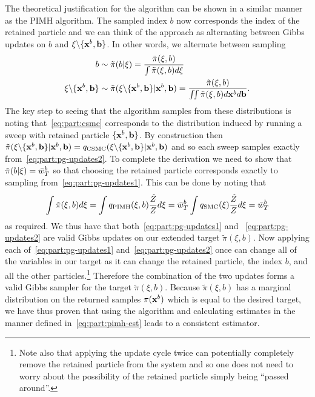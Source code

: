 The theoretical justification for the \pg algorithm can be shown in a similar manner as the PIMH algorithm.
The sampled index $b$ now corresponds the index of the retained particle and we can think of the
approach as alternating between Gibbs updates on $b$ and $\mathbf{\xi} \backslash \{\mathbf{x}^b,\mathbf{b}\}$.    In other
words, we alternate between sampling 
\begin{subequations}
	\label{eq:part:pg-updates}
	\begin{align}
	b &\sim \tilde{\pi}(b | \mathbf{\xi}) = \frac{\tilde{\pi}(\xi,b)}{\int \tilde{\pi}(\xi,b) d\xi} \label{eq:part:pg-updates1}\\
	\mathbf{\xi} \backslash \{\mathbf{x}^b,\mathbf{b}\} & \sim \tilde{\pi}(\mathbf{\xi} \backslash \{\mathbf{x}^b,\mathbf{b}\}  | \mathbf{x}^b,\mathbf{b}) =
	\frac{\tilde{\pi}(\xi,b)}{\iint \tilde{\pi}(\xi,b) d\mathbf{x}^b d\mathbf{b}}. \label{eq:part:pg-updates2}
		\end{align}
\end{subequations} 
The key step to seeing that the \pg
algorithm samples from these distributions is noting that~\eqref{eq:part:csmc} corresponds to the distribution
induced by running a \csmc sweep with retained particle $\{\mathbf{x}^b,\mathbf{b}\}$.  By construction
then $\tilde{\pi}(\mathbf{\xi} \backslash \{\mathbf{x}^b,\mathbf{b}\}  | \mathbf{x}^b,\mathbf{b}) = q_{\text{CSMC}}(\mathbf{\xi} \backslash \{\mathbf{x}^b,\mathbf{b}\}  | \mathbf{x}^b,\mathbf{b})$
and so each \csmc sweep samples exactly from~\eqref{eq:part:pg-updates2}.  To complete the derivation
we need to show that $\tilde{\pi}(b | \mathbf{\xi}) = \bar{w}_T^b$ so that choosing the retained particle corresponds
exactly to sampling from~\eqref{eq:part:pg-updates1}.    This can be done by noting that
\begin{align}
\int \tilde{\pi}(\xi,b) d\xi = \int q_{\text{PIMH}}(\mathbf{\xi},b) \frac{\hat{Z}}{Z} d\xi = \bar{w}_T^b
\int q_{\text{SMC}}(\mathbf{\xi}) \frac{\hat{Z}}{Z} d\xi = \bar{w}_T^b
\end{align}
as required.  We thus have that both~\eqref{eq:part:pg-updates1} and ~\eqref{eq:part:pg-updates2} are valid
Gibbs updates on our extended target $\tilde{\pi}(\xi,b)$.  Now applying each 
of~\eqref{eq:part:pg-updates1} and~\eqref{eq:part:pg-updates2} once can change all of the variables in
our target as it can change the retained particle, the index $b$, and all the other particles.\footnote{Note
	also that applying the update cycle twice can potentially completely remove the retained particle from the
	system and so one does not need to worry about the possibility of the retained particle simply being ``passed around''.}
Therefore the combination of the two updates forms a valid Gibbs sampler for the target $\tilde{\pi}(\xi,b)$.
Because $\tilde{\pi}(\xi,b)$ has a marginal distribution on the returned samples $\pi (\mathbf{x}^b)$ which is equal to
the desired target, we have thus proven that using the \pg algorithm and calculating estimates in the manner 
defined in~\eqref{eq:part:pimh-est} leads to a consistent estimator.


